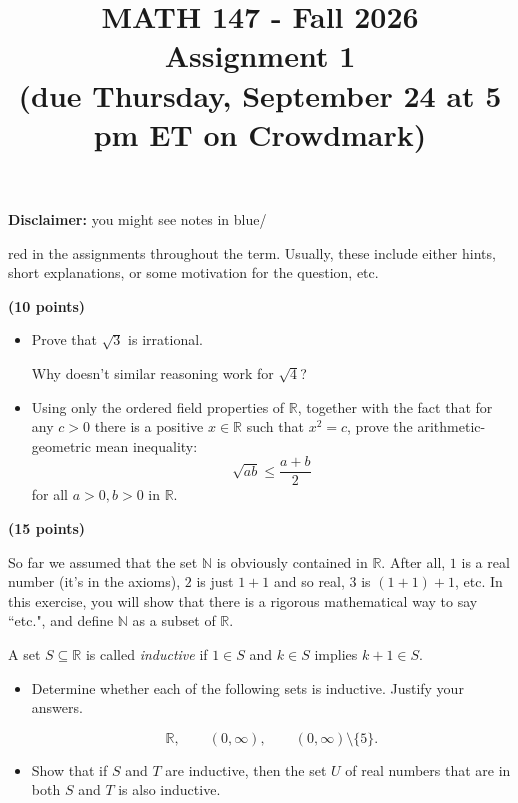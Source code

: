 \documentclass[11pt, oneside,usenames,dvipsnames]{article}
\title{{\large\bf MATH 147 - Fall 2026\\
Assignment 1}\\
{\small (due Thursday, September 24 at 5 pm ET on Crowdmark)}
}
\author{}
\date{}
\begin{document}
\maketitle

\vspace{-2cm}

\medskip
{\bf Disclaimer:} you might see notes in {\color{blue}blue}/{{\color{red}red} in the assignments throughout the term. Usually, these include either hints, short explanations, or some motivation for the question, etc. 


\bigskip





\bigskip


 {\bf (10 points)}
\begin{itemize}
	\item[\it (i)] Prove that $\sqrt{3}$ is irrational.

	{\color{blue} Why doesn't similar reasoning  work for $\sqrt{4}$?}

	\item[\it (ii)] Using only the ordered field properties of $\mathbb{R}$, together with the fact that for any $c>0$ there is a positive $x\in\mathbb{R}$  such that $x^2 = c$, prove the arithmetic-geometric mean inequality:
	$$
	\sqrt{ab} \leq \frac{a+b}2
	$$
	for all $a > 0, b > 0$ in $\mathbb{R}$. 
	
\end{itemize}




\medskip

 {\bf (15 points)} 

{\color{blue} So far we assumed that the set $\mathbb{N}$ is obviously contained in $\mathbb{R}$. After all, $1$ is
	a real number (it’s in the axioms), $2$ is just $1+1$ and so real, $3$ is $(1+1)+1$, etc. In this exercise, you will show that there is a rigorous mathematical way to say ``etc.", and define $\mathbb{N}$ as a subset of $\mathbb{R}$.}
	
	
	A set $S\subseteq \mathbb R$ is called \emph{inductive} if $ 1\in S$ and $k \in S$ implies $k+1\in S.$
\begin{itemize}
	\item[\it(i)] Determine whether each of the following sets is inductive. Justify your answers.
	
	$$
	\mathbb R,\qquad (0,\infty),\qquad (0,\infty)\setminus \{5\}.
	$$
	\item[\it(ii)] Show that if $S$ and $T$ are inductive, then the set $U$ of real numbers that are in both $S$ and $T$ is also inductive.
	

\end{itemize}}
\end{document}
